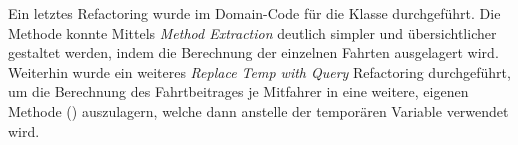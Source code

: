 Ein letztes Refactoring wurde im Domain-Code für die Klasse \href{https://github.com/yschiebelhut/carpool-java/blob/39b9b0aa5415a201103c65226606de2d73cf6ab0/3-carpool-java-domain/src/main/java/model/Fahrperiode.java#L86}{} durchgeführt.
Die Methode  konnte Mittels \emph{Method Extraction} deutlich simpler und übersichtlicher gestaltet werden, indem die Berechnung der einzelnen Fahrten ausgelagert wird.
Weiterhin wurde ein weiteres \emph{Replace Temp with Query} Refactoring durchgeführt, um die Berechnung des Fahrtbeitrages je Mitfahrer in eine weitere, eigenen Methode () auszulagern, welche dann anstelle der temporären Variable verwendet wird.
